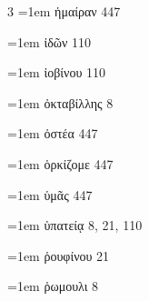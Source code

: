 \begin{multicols}{3}
\hangindent=1em ἡμαίραν 447\par
\hangindent=1em ἰδῶν 110\par
\hangindent=1em ἰοβίνου 110\par
\hangindent=1em ὀκταβίλλης 8\par
\hangindent=1em ὀστέα 447\par
\hangindent=1em ὁρκίζομε 447\par
\hangindent=1em ὑμᾶς 447\par
\hangindent=1em ὑπατείᾳ 8, 21, 110\par
\hangindent=1em ῥουφίνου 21\par
\hangindent=1em ῥωμουλι 8\par\end{multicols}
